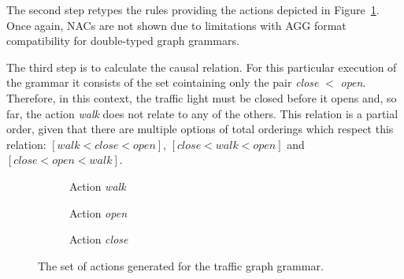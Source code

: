 The second step retypes the rules providing the actions depicted in Figure~\ref{fig:tests:actions-traffic}. Once again, NACs are not shown due to limitations with AGG format compatibility for double-typed graph grammars.

The third step is to calculate the causal relation. For this particular execution of the grammar it consists of the set cointaining only the pair \emph{close} $<$ \emph{open}. Therefore, in this context, the traffic light must be closed before it opens and, so far, the action \emph{walk} does not relate to any of the others. This relation is a partial order, given that there are multiple options of total orderings which respect this relation: $[walk < close < open]$, $[close < walk < open]$ and $[close < open < walk]$.

\begin{figure}[!ht]
  \centering
  \begin{subfigure}[t]{.5\textwidth}
    \centerline{}
    \caption{Action \emph{walk}}
  \end{subfigure}
  \begin{subfigure}[t]{.5\textwidth}
    \centerline{}
    \caption{Action \emph{open}}
  \end{subfigure}
  \begin{subfigure}[t]{.5\textwidth}
    \centerline{}
    \caption{Action \emph{close}}
  \end{subfigure}
  \caption{The set of actions generated for the traffic graph grammar.}\label{fig:tests:actions-traffic}
\end{figure}

